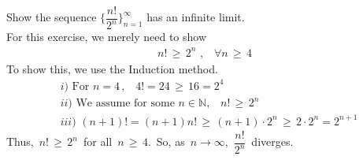 \begin{exercise}\label{exercise_4_ch_2}
Show the sequence $\Big\{\dfrac{n!}{2^{n}}\Big\}_{n=1}^{\infty}$ has an infinite limit.\\[1ex]
For this exercise, we merely need to show 
\begin{align*}
    n! \hspace{2pt} \geq \hspace{2pt} 2^{n} \hspace{4pt}, \hspace{10pt} \forall n \hspace{2pt} \geq \hspace{2pt} 4
\end{align*}
To show this, we use the Induction method. 
\begin{align*}
    &i) \hspace{4pt} \text{For} \hspace{4pt} n = 4 \hspace{2pt}, \hspace{10pt} 4! = 24 \hspace{2pt} \geq \hspace{2pt} 16 = 2^{4}\\[2ex]
    &ii) \hspace{4pt} \text{We assume for some} \hspace{4pt} n \in \mathbb{N}, \hspace{10pt} n! \hspace{2pt} \geq \hspace{2pt} 2^{n}\\[2ex]
    &iii) \hspace{4pt} (n+1)! = (n+1)n! \hspace{2pt} \geq \hspace{2pt} (n+1) \cdot 2^{n} \hspace{2pt} \geq \hspace{2pt} 2 \cdot 2^{n} = 2^{n+1}
\end{align*}
Thus, $\hspace{2pt} n! \hspace{2pt} \geq \hspace{2pt} 2^{n} \hspace{2pt}$ for all $\hspace{2pt} n \hspace{2pt} \geq \hspace{2pt} 4. \hspace{2pt}$ So, as $\hspace{2pt} n \longrightarrow \infty, \hspace{4pt} \dfrac{n!}{2^{n}} \hspace{2pt}$ diverges.  
\end{exercise}



